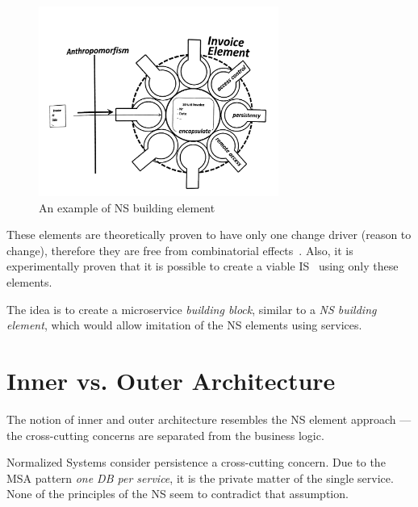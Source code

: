 \documentclass[thesis=M,english,hidelinks]{FITthesis}[2012/10/20]
\begin{document}
\begin{figure}
  \centering
    \includegraphics[width=0.7\textwidth]{images/building_element.png}
    \caption{An example of \acrshort{NS} building element~\cite{ns-toward-general-theory}}
    \label{fig:ns-building-element}
\end{figure}

These elements are theoretically proven to have only one change driver (reason to change), therefore they are free from combinatorial effects~\cite{ns-toward-general-theory}. Also, it is experimentally proven that it is possible to create a viable \acrfull{IS}~\cite{ns-enabling} using only these elements.

The idea is to create a microservice \textit{building block}, similar to a \textit{\acrshort{NS} building element}, which would allow imitation of the \acrshort{NS} elements using services\footnotemark.


\section{Inner vs. Outer Architecture}
\label{sec:appl:inout}

The notion of inner and outer architecture resembles the \acrshort{NS} element approach --- the cross-cutting concerns are separated from the business logic.

Normalized Systems consider persistence a cross-cutting concern. Due to the \acrshort{MSA} pattern \textit{one DB per service}, it is the private matter of the single service. None of the principles of the \acrshort{NS} seem to contradict that assumption.
\end{document}
